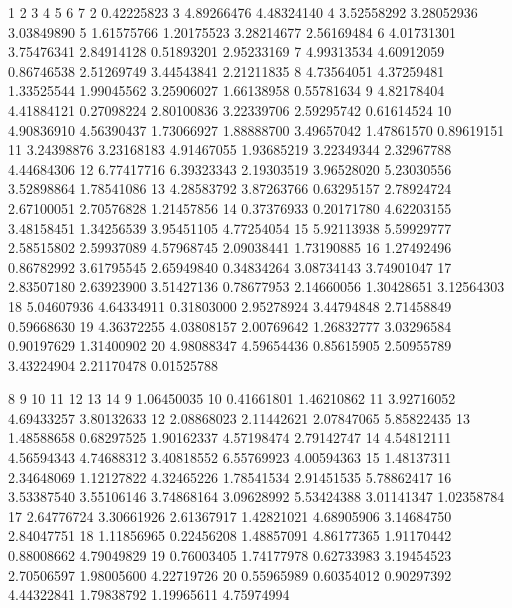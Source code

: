 \documentclass[11pt]{exam} %
\newenvironment{codeSmall}%
   {\par\noindent\adjustbox{margin=1ex,bgcolor=shadecolor,margin=0ex \medskipamount}\bgroup\minipage\linewidth\verbatim\footnotesize}%
   {\endverbatim\endminipage\egroup}
\begin{document}
\begin{questions}
\begin{parts}
\begin{codeSmall}
            1          2          3          4          5          6          7
2  0.42225823                                                                  
3  4.89266476 4.48324140                                                       
4  3.52558292 3.28052936 3.03849890                                            
5  1.61575766 1.20175523 3.28214677 2.56169484                                 
6  4.01731301 3.75476341 2.84914128 0.51893201 2.95233169                      
7  4.99313534 4.60912059 0.86746538 2.51269749 3.44543841 2.21211835           
8  4.73564051 4.37259481 1.33525544 1.99045562 3.25906027 1.66138958 0.55781634
9  4.82178404 4.41884121 0.27098224 2.80100836 3.22339706 2.59295742 0.61614524
10 4.90836910 4.56390437 1.73066927 1.88888700 3.49657042 1.47861570 0.89619151
11 3.24398876 3.23168183 4.91467055 1.93685219 3.22349344 2.32967788 4.44684306
12 6.77417716 6.39323343 2.19303519 3.96528020 5.23030556 3.52898864 1.78541086
13 4.28583792 3.87263766 0.63295157 2.78924724 2.67100051 2.70576828 1.21457856
14 0.37376933 0.20171780 4.62203155 3.48158451 1.34256539 3.95451105 4.77254054
15 5.92113938 5.59929777 2.58515802 2.59937089 4.57968745 2.09038441 1.73190885
16 1.27492496 0.86782992 3.61795545 2.65949840 0.34834264 3.08734143 3.74901047
17 2.83507180 2.63923900 3.51427136 0.78677953 2.14660056 1.30428651 3.12564303
18 5.04607936 4.64334911 0.31803000 2.95278924 3.44794848 2.71458849 0.59668630
19 4.36372255 4.03808157 2.00769642 1.26832777 3.03296584 0.90197629 1.31400902
20 4.98088347 4.59654436 0.85615905 2.50955789 3.43224904 2.21170478 0.01525788

            8          9         10         11         12         13         14                                                                        
9  1.06450035                                                                  
10 0.41661801 1.46210862                                                       
11 3.92716052 4.69433257 3.80132633                                            
12 2.08868023 2.11442621 2.07847065 5.85822435                                 
13 1.48588658 0.68297525 1.90162337 4.57198474 2.79142747                      
14 4.54812111 4.56594343 4.74688312 3.40818552 6.55769923 4.00594363           
15 1.48137311 2.34648069 1.12127822 4.32465226 1.78541534 2.91451535 5.78862417
16 3.53387540 3.55106146 3.74868164 3.09628992 5.53424388 3.01141347 1.02358784
17 2.64776724 3.30661926 2.61367917 1.42821021 4.68905906 3.14684750 2.84047751
18 1.11856965 0.22456208 1.48857091 4.86177365 1.91170442 0.88008662 4.79049829
19 0.76003405 1.74177978 0.62733983 3.19454523 2.70506597 1.98005600 4.22719726
20 0.55965989 0.60354012 0.90297392 4.44322841 1.79838792 1.19965611 4.75974994


\end{codeSmall}
\end{parts}
\end{questions}
\end{document}
